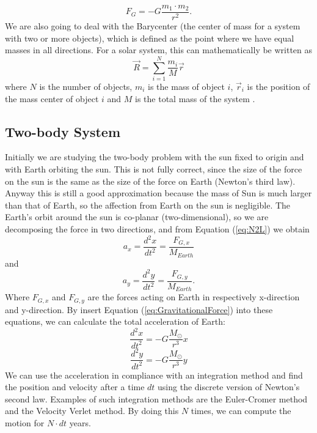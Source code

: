 \documentclass[norsk,a4paper,12pt]{article}
\begin{document}
\begin{equation}
F_G=-G\frac{m_1\cdot m_2}{r^2}.
\label{eq:absGravitationalForce}
\end{equation}
We are also going to deal with the Barycenter (the center of mass for a system with two or more objects), which is defined as the point where we have equal masses in all directions. For a solar system, this can mathematically be written as
\begin{equation}
\vec{R}=\sum_{i=1}^N \frac{m_i}{M}\vec{r}
\end{equation}
where $N$ is the number of objects, $m_i$ is the mass of object $i$, $\vec{r}_i$ is the position of the mass center of object $i$ and $M$ is the total mass of the system \cite{Barycenter}.

\subsection{Two-body System}
Initially we are studying the two-body problem with the sun fixed to origin and with Earth orbiting the sun. This is not fully correct, since the size of the force on the sun is the same as the size of the force on Earth (Newton's third law). Anyway this is still a good approximation because the mass of Sun is much larger than that of Earth, so the affection from Earth on the sun is negligible. The Earth's orbit around the sun is co-planar (two-dimensional), so we are decomposing the force in two directions, and from Equation (\ref{eq:N2L}) we obtain
\begin{equation}
a_x=\frac{d^2x}{dt^2}=\frac{F_{G,x}}{M_{Earth}}
\end{equation}
and
\begin{equation}
a_y=\frac{d^2y}{dt^2}=\frac{F_{G,y}}{M_{Earth}}.
\end{equation}
Where $F_{G,x}$ and $F_{G,y}$ are the forces acting on Earth in respectively x-direction and y-direction. By insert Equation (\ref{eq:GravitationalForce}) into these equations, we can calculate the total acceleration of Earth:
\begin{equation}
\frac{d^2x}{dt^2}=-G\frac{M_\odot}{r^3}x
\end{equation}
\begin{equation}
\frac{d^2y}{dt^2}=-G\frac{M_\odot}{r^3}y
\end{equation}
We can use the acceleration in compliance with an integration method and find the position and velocity after a time $dt$ using the discrete version of Newton's second law. Examples of such integration methods are the Euler-Cromer method and the Velocity Verlet method. By doing this $N$ times, we can compute the motion for $N\cdot dt$ years. 
\end{document}
